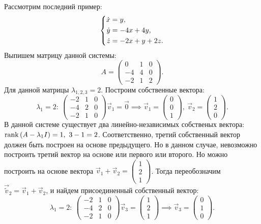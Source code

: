 		Рассмотрим последний пример:
		\[ \left\lbrace \begin{aligned} \dot{x} &= y, \\ \dot{y} &= -4x + 4y, \\ \dot{z} &= -2x + y + 2z. \end{aligned} \right. \]
		Выпишем матрицу данной системы:
		\[ A = \begin{pmatrix} 0 & 1 & 0 \\ -4 & 4 & 0 \\ -2 & 1 & 2 \end{pmatrix}. \]
		Для данной матрицы $\lambda_{1, 2, 3} = 2$. Построим собственные вектора:
		\[ \lambda_1 = 2: ~ \begin{pmatrix} -2 & 1 & 0 \\ -4 & 2 & 0 \\ -2 & 1 & 0 \end{pmatrix} \vec{v}_1 = \vec{0} \implies \vec{v}_1 = \begin{pmatrix} 0 \\ 0 \\ 1 \end{pmatrix}, ~ \vec{v}_2 = \begin{pmatrix} 1 \\ 2 \\ 0 \end{pmatrix}. \]
		В данной системе существует два линейно-независимых собственых вектора: \( \operatorname{rank}\left( A - \lambda_1 I \right) = 1, ~ 3 - 1 = 2 \). Соответственно, третий собственный вектор должен быть построен на основе предыдущего. Но в данном случае, невозможно построить третий вектор на основе или первого или второго. Но можно построить на основе вектора $\vec{v}_1 + \vec{v}_2 = \begin{pmatrix} 1 \\ 2 \\ 1 \end{pmatrix}$. Тогда переобозначим $\vec{\tilde{v}}_2 = \vec{v}_1 + \vec{v}_2$, и найдем присоединенный собственный вектор:
		\[ \lambda_1 = 2: ~ \begin{pmatrix} -2 & 1 & 0 \\ -4 & 2 & 0 \\ -2 & 1 & 0 \end{pmatrix} \vec{v}_3 = \begin{pmatrix} 1 \\ 2 \\ 1 \end{pmatrix} \implies \vec{v}_3 = \begin{pmatrix} 0 \\ 1 \\ 0 \end{pmatrix}. \]
